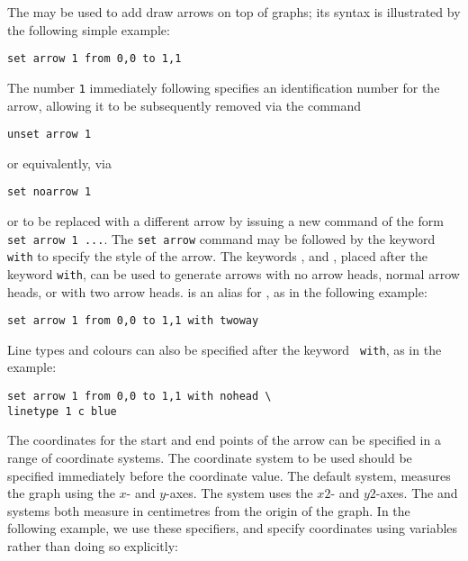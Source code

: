\label{sec:set_arrow} The  may be used to add
draw arrows on top of graphs; its syntax is illustrated by the following simple
example:

\begin{verbatim}
set arrow 1 from 0,0 to 1,1
\end{verbatim}

\noindent The number {\tt 1} immediately following 
specifies an identification number for the arrow, allowing it to be
subsequently removed via the command

\begin{verbatim}
unset arrow 1
\end{verbatim}

\noindent or equivalently, via

\begin{verbatim}
set noarrow 1
\end{verbatim}

\noindent or to be replaced with a different arrow by issuing a new command of
the form {\tt set arrow 1~...}.  The {\tt set arrow} command may be followed by
the keyword {\tt with} to specify the style of the arrow. The keywords
,  and , placed after the
keyword {\tt with}, can be used to generate arrows with no arrow heads, normal
arrow heads, or with two arrow heads.   is an alias for
, as in the following example:

\begin{verbatim}
set arrow 1 from 0,0 to 1,1 with twoway
\end{verbatim}

\noindent Line types and colours can also be specified after the keyword {\tt
with}, as in the example:

\begin{verbatim}
set arrow 1 from 0,0 to 1,1 with nohead \
linetype 1 c blue
\end{verbatim}

The coordinates for the start and end points of the arrow can be specified in
a range of coordinate systems. The coordinate system to be used should be
specified immediately before the coordinate value. The default system,
\indcot{first} measures the graph using the $x$- and $y$-axes. The
\indcot{second} system uses the $x2$- and $y2$-axes. The  and
\indcot{graph} systems both measure in centimetres from the origin of the
graph. In the following example, we use these specifiers, and specify
coordinates using variables rather than doing so explicitly:

